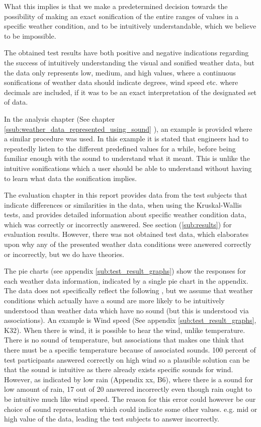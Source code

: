 What this implies is that we make a predetermined decision towards the possibility of making an exact sonification of the entire ranges of values in a specific weather condition, and to be intuitively understandable, which we believe to be impossible.

The obtained test results have both positive and negative indications regarding the success of intuitively understanding the visual and sonified weather data, but the data only represents low, medium, and high values, where a continuous sonifications of weather data should indicate degrees, wind speed etc. where decimals are included, if it was to be an exact interpretation of the designated set of data. 

In the analysis chapter (See chapter \ref{ssub:weather_data_represented_using_sound} ), an example is provided where a similar procedure was used. In this example it is stated that engineers had to repeatedly listen to the different predefined values for a while, before being familiar enough with the sound to understand what it meant. This is unlike the intuitive sonifications which a user should be able to understand without having to learn what data the sonification implies.

The evaluation chapter in this report provides data from the test subjects that indicate differences or similarities in the data, when using the Kruskal-Wallis tests, and provides detailed information about specific weather condition data, which was correctly or incorrectly answered. See section (\ref{sub:results}) for evaluation results. However, there was not obtained test data, which elaborates upon why any of the presented weather data conditions were answered correctly or incorrectly, but we do have theories.


The pie charts (see appendix \ref{sub:test_result_graphs}) show the responses for each weather data information, indicated by a single pie chart in the appendix. The data does not specifically reflect the following , but we assume that weather conditions which actually have a sound are more likely to be intuitively understood than weather data which have no sound (but this is understood via associations). An example is Wind speed (See appendix \ref{sub:test_result_graphs}, K32). When there is wind, it is possible to hear the wind, unlike temperature. There is no sound of temperature, but associations that makes one think that there must be a specific temperature because of associated sounds. 100 percent of test participants answered correctly on high wind so a plausible solution can be that the sound is intuitive as there already exists specific sounds for wind. However, as indicated by low rain (Appendix xx,  B6), where there is a sound for low amount of rain, 17 out of 20 answered incorrectly even though rain ought to be intuitive much like wind speed. The reason for this error could however be our choice of sound representation which could indicate some other values. e.g. mid or high value of the data, leading the test subjects to answer incorrectly.

